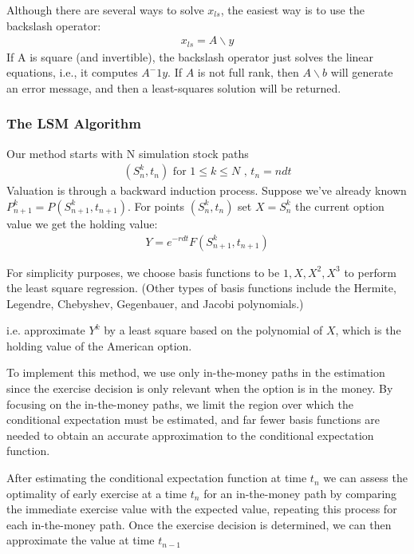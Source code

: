 \documentclass{article}
\begin{document}
Although there are several ways to solve $x_{ls}$, the easiest way is to use the backslash operator:
\begin{align*}
    x_{ls} = A \backslash y
\end{align*}
If A is square (and invertible), the backslash operator just solves the linear equations, i.e., it computes $A^-1 y$. If $A$ is not full rank, then $A \backslash b$ will generate an error message, and then a least-squares solution will be returned.

\subsubsection{The LSM Algorithm}
Our method starts with N simulation stock paths 
\begin{align*}
    (S^k_n, t_n) \text{ for } 1 \leq k \leq N \text{ , } t_n = ndt
\end{align*}
Valuation is through a backward induction process. Suppose we've already known $P^k_{n+1} = P(S^k_{n+1},t_{n+1})$. For points $(S^k_n, t_n)$ set $X = S^k_n$ the current option value we get the holding value:
\begin{align*}
    Y = e^{-rdt} F(S^k_{n+1}, t_{n+1})
\end{align*}

For simplicity purposes, we choose basis functions to be $1, X, X^2, X^3$ to perform the least square regression. (Other types of basis functions include the Hermite, Legendre, Chebyshev, Gegenbauer, and Jacobi polynomials.)

i.e. approximate $Y^k$ by a least square based on the polynomial of $X$, which is the holding value of the American option.

To implement this method, we use only in-the-money paths in the estimation since the exercise decision is only relevant when the option is in the money. By focusing on the in-the-money paths, we limit the region over which the conditional expectation must be estimated, and far fewer basis functions are needed to obtain an accurate approximation to the conditional expectation function.


After estimating the conditional expectation function at time $t_{n}$ we can assess the optimality of early exercise at a time 
$t_n$ for an in-the-money path by comparing the immediate exercise value with the expected value, repeating this process for each in-the-money path. Once the exercise decision is determined, we can then approximate the value at time $t_{n-1}$
\end{document}
